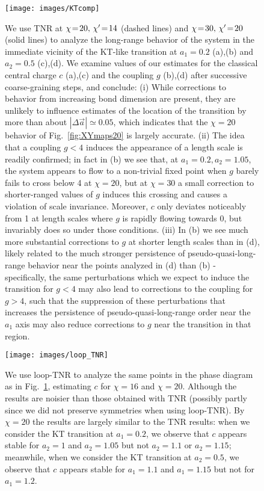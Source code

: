 \documentclass[aps,prb,letterpaper,superscriptaddress,twocolumn,showpacs,floatfix,10pt]{revtex4-1}
\begin{document}
\begin{figure}[h!]
\texttt{[image: images/KTcomp]}
\caption{We use TNR at $\chi\nobreak\!=\nobreak\!20, \,\chi'\nobreak\!=\nobreak\!14$ (dashed lines) and $\chi\nobreak\!=\nobreak\!30, \,\chi'\nobreak\!=\nobreak\!20$
(solid lines) to analyze the long-range behavior of the system in the
immediate vicinity of the KT-like transition at $a_1=0.2$ (a),(b) and
$a_2=0.5$ (c),(d). We examine values of our estimates for the classical central
charge $c$ (a),(c) and the coupling $g$ (b),(d) after successive coarse-graining
steps, and conclude:
  (i) While corrections to behavior from increasing bond dimension are
  present, they are unlikely to influence estimates of the location of the
  transition by more than about $|\Delta\vec{a}| \simeq 0.05$, which indicates
  that the $\chi=20$ behavior of Fig.~\ref{fig:XYmaps20} is largely accurate.
  (ii) The idea that a coupling $g<4$ induces the appearance of a length
  scale is readily confirmed; in fact in (b) we see that, at $a_1=0.2,a_2=1.05$,
  the system appears to flow to a non-trivial fixed point when $g$ barely fails
  to cross below 4 at $\chi=20$, but at $\chi=30$ a small correction to 
  shorter-ranged values of $g$ induces this crossing and causes a violation
  of scale invariance. Moreover, $c$ only deviates noticeably from 1 at
  length scales where $g$ is rapidly flowing towards 0, but invariably does
  so under those conditions.
  (iii) In (b) we see much more substantial corrections to $g$ at shorter
  length scales than in (d), likely related to the much stronger persistence
  of pseudo-quasi-long-range behavior near the points analyzed in (d) than
  (b) - specifically, the same perturbations which we expect to induce the
  transition for $g<4$ may also lead to corrections to the coupling for $g>4$,
  such that the suppression of these perturbations that increases the
  persistence of pseudo-quasi-long-range order near the $a_1$ axis may
  also reduce corrections to $g$ near the transition in that region.
}
\label{fig:KTcomp}
\end{figure}

\begin{figure}[h!]
\texttt{[image: images/loop\_TNR]}
\caption{We use loop-TNR to analyze the same points in the phase diagram
as in Fig.~\ref{fig:KTcomp}, estimating $c$ for $\chi=16$ and $\chi=20$.
Although the results are noisier than those obtained with TNR (possibly partly
since we did not preserve symmetries when using loop-TNR).
By $\chi=20$ the results are largely similar to the TNR results: when we
consider the KT transition at $a_1=0.2$, we observe that $c$ appears stable
for $a_2=1$ and $a_2=1.05$ but not $a_2=1.1$ or $a_2=1.15$; meanwhile, when
we consider the KT transition at $a_2=0.5$, we observe that $c$ appears stable
for $a_1=1.1$ and $a_1=1.15$ but not for $a_1=1.2$.}
\label{fig:loopKT}
\end{figure}
\end{document}
